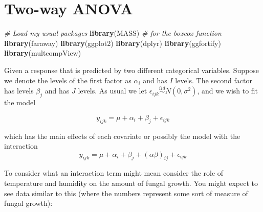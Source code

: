 \documentclass[]{book}
\newenvironment{Shaded}{\begin{snugshade}}{\end{snugshade}}
\newcommand{\KeywordTok}[1]{\textcolor[rgb]{0.13,0.29,0.53}{\textbf{{#1}}}}
\newcommand{\CommentTok}[1]{\textcolor[rgb]{0.56,0.35,0.01}{\textit{{#1}}}}
\newcommand{\NormalTok}[1]{{#1}}
\theoremstyle{definition}
\theoremstyle{definition}
\theoremstyle{remark}
\begin{document}
\chapter{Two-way ANOVA}\label{two-way-anova}

\begin{Shaded}
\begin{Highlighting}[]
\CommentTok{# Load my usual packages}
\KeywordTok{library}\NormalTok{(MASS)     }\CommentTok{# for the boxcox function}
\KeywordTok{library}\NormalTok{(faraway)}
\KeywordTok{library}\NormalTok{(ggplot2)}
\KeywordTok{library}\NormalTok{(dplyr)}
\KeywordTok{library}\NormalTok{(ggfortify)}
\KeywordTok{library}\NormalTok{(multcompView)}
\end{Highlighting}
\end{Shaded}

Given a response that is predicted by two different categorical
variables. Suppose we denote the levels of the first factor as
\(\alpha_{i}\) and has \(I\) levels. The second factor has levels
\(\beta_{j}\) and has \(J\) levels. As usual we let
\(\epsilon_{ijk}\stackrel{iid}{\sim}N\left(0,\sigma^{2}\right)\), and we
wish to fit the model

\[y_{ijk}=\mu+\alpha_{i}+\beta_{j}+\epsilon_{ijk}\]

which has the main effects of each covariate or possibly the model with
the interaction
\[y_{ijk}=\mu+\alpha_{i}+\beta_{j}+\left(\alpha\beta\right)_{ij}+\epsilon_{ijk}\]

To consider what an interaction term might mean consider the role of
temperature and humidity on the amount of fungal growth. You might
expect to see data similar to this (where the numbers represent some
sort of measure of fungal growth):
\end{document}
